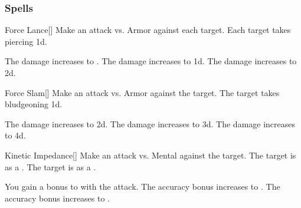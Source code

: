 \subsubsection{Spells}


\lowercase{\hypertarget{spell:Force Lance}{}}\label{spell:Force Lance}
\begin{freeability}[Rank 1]{\hypertarget{spell:Force Lance}{Force Lance}}[]
Make an attack vs. Armor against each target.
\hit Each target takes piercing  \minus1d.

\rankline
{} The damage increases to .
 The damage increases to  \plus1d.
 The damage increases to  \plus2d.

\end{freeability}
\vspace{0.25em}



\lowercase{\hypertarget{spell:Force Slam}{}}\label{spell:Force Slam}
\begin{freeability}[Rank 1]{\hypertarget{spell:Force Slam}{Force Slam}}[]
Make an attack vs. Armor against the target.
\hit The target takes bludgeoning  \plus1d.

\rankline
{} The damage increases to  \plus2d.
 The damage increases to  \plus3d.
 The damage increases to  \plus4d.

\end{freeability}
\vspace{0.25em}



\lowercase{\hypertarget{spell:Kinetic Impedance}{}}\label{spell:Kinetic Impedance}
\begin{freeability}[Rank 1]{\hypertarget{spell:Kinetic Impedance}{Kinetic Impedance}}[]
Make an attack vs. Mental against the target.
\hit The target is  as a .
\crit The target is  as a .

\rankline
{} You gain a  bonus to  with the attack.
 The accuracy bonus increases to .
 The accuracy bonus increases to .

\end{freeability}
\vspace{0.25em}



